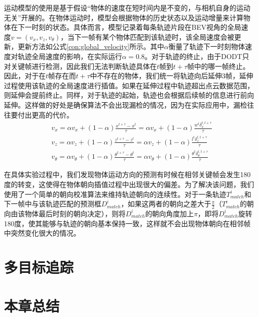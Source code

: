 运动模型的使用是基于假设“物体的速度在短时间内是不变的，与相机自身的运动无关”开展的。在物体运动时，模型会根据物体的历史状态以及运动增量来计算物体在下一时刻的状态。具体而言，模型记录着每条轨迹片段在BEV视角的全局速度$v = (v_x, v_z, v_{\theta})$，当下一帧有某个物体匹配到该轨迹时，该全局速度会被更新，更新方法如公式\ref{con:global_velocity}所示。其中$\alpha$衡量了轨迹下一时刻物体速度对轨迹全局速度的影响，在实际运行$\alpha = 0.8$。对于轨迹的终止，由于DODT只对关键帧进行检测，因此我们无法判断轨迹具体在$t$帧到$t+\tau$帧中的哪一帧终止。因此，对于在$t$帧存在而$t+\tau$中不存在的物体，我们统一将轨迹向后延伸3帧，延伸过程使用该轨迹的全局速度进行插值。如果在延伸过程中轨迹超出点云数据范围，则延伸会提前终止。同样，对于轨迹的起始，轨迹也会根据后续帧的信息进行前向延伸。这样做的好处是确保算法不会出现漏检的情况，因为在实际应用中，漏检往往要付出更高的代价。
\begin{equation}
\begin{aligned}
	& v_x = \alpha v_x + (1-\alpha)\frac{x^{t+\tau} - x^{t}}{\tau} = \alpha v_x + (1-\alpha)\frac{w^t \delta_x^{t,t+\tau}}{\tau}\\
	& v_z = \alpha v_z + (1-\alpha)\frac{z^{t+\tau} - z^{t}}{\tau} = \alpha v_z + (1-\alpha)\frac{l^t \delta_z^{t,t+\tau}}{\tau}\\
	& v_{\theta} = \alpha v_{\theta} + (1-\alpha)\frac{\theta^{t+\tau} - \theta^{t}}{\tau} = \alpha v_{\theta} + (1-\alpha)\frac{\theta^t \delta_{\theta}^{t,t+\tau}}{\tau}
\end{aligned}
\label{con:global_velocity}
\end{equation}

在具体实验过程中，我们发现物体运动方向的预测有时候在相邻关键帧会发生180度的转变，这使得在物体朝向插值过程中出现很大的偏差。为了解决该问题，我们使用了一个简单的朝向校准算法来维持轨迹朝向的连续性。对于一条轨迹$T^i_{match}$和下一帧中与该轨迹匹配的预测框$D^i_{match}$，如果这两者的朝向之差大于$\frac{\pi}{2}$（$T^i_{match}$的朝向由该物体最后时刻的朝向决定），则将$D^i_{match}$的朝向角度加上$\pi$，即将$D^i_{match}$旋转180度，使其能够与轨迹的朝向基本保持一致，这样就不会出现物体朝向在相邻帧中突然变化很大的情况。
\section{多目标追踪}
\label{tracking_module}




\section{本章总结}
\label{metho_conclusion}

\ifprint
\newpage
\thispagestyle{empty}
\mbox{}

\clearpage
\setcounter{page}{10}
\fi